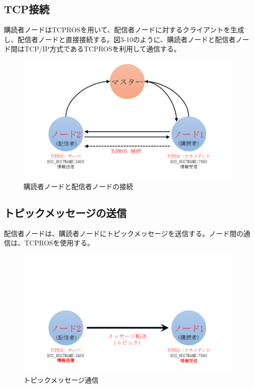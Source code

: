 \subsection{TCP接続}
購読者ノードはTCPROSを用いて、配信者ノードに対するクライアントを生成し、配信者ノードと直接接続する。図3-10のように、購読者ノードと配信者ノード間はTCP/IP方式であるTCPROSを利用して通信する。

\begin{figure}[h]
  \centering
  \includegraphics[width=12cm]{pictures/chapter3/pic_03_10.png}
  \caption{購読者ノードと配信者ノードの接続}
\end{figure}

\subsection{トピックメッセージの送信}
配信者ノードは、購読者ノードにトピックメッセージを送信する。ノード間の通信は、TCPROSを使用する。

\begin{figure}[h]
  \centering
  \includegraphics[width=12cm]{pictures/chapter3/pic_03_11.png}
  \caption{トピックメッセージ通信}
\end{figure}

